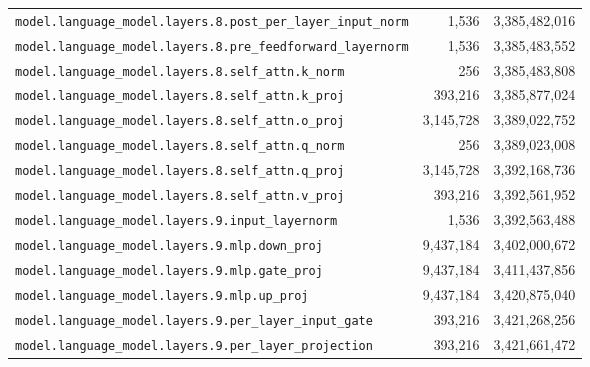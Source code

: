 \documentclass[10pt,a4paper]{article}
\theoremstyle{definition}
\begin{document}
\begin{appendices}
\begin{longtable}{p{9.5cm}rr}
\texttt{model.\allowbreak{}language\_model.\allowbreak{}layers.\allowbreak{}8.\allowbreak{}post\_per\_layer\_input\_norm} & 1,536 & 3,385,482,016 \\
\texttt{model.\allowbreak{}language\_model.\allowbreak{}layers.\allowbreak{}8.\allowbreak{}pre\_feedforward\_layernorm} & 1,536 & 3,385,483,552 \\
\texttt{model.\allowbreak{}language\_model.\allowbreak{}layers.\allowbreak{}8.\allowbreak{}self\_attn.\allowbreak{}k\_norm} & 256 & 3,385,483,808 \\
\texttt{model.\allowbreak{}language\_model.\allowbreak{}layers.\allowbreak{}8.\allowbreak{}self\_attn.\allowbreak{}k\_proj} & 393,216 & 3,385,877,024 \\
\texttt{model.\allowbreak{}language\_model.\allowbreak{}layers.\allowbreak{}8.\allowbreak{}self\_attn.\allowbreak{}o\_proj} & 3,145,728 & 3,389,022,752 \\
\texttt{model.\allowbreak{}language\_model.\allowbreak{}layers.\allowbreak{}8.\allowbreak{}self\_attn.\allowbreak{}q\_norm} & 256 & 3,389,023,008 \\
\texttt{model.\allowbreak{}language\_model.\allowbreak{}layers.\allowbreak{}8.\allowbreak{}self\_attn.\allowbreak{}q\_proj} & 3,145,728 & 3,392,168,736 \\
\texttt{model.\allowbreak{}language\_model.\allowbreak{}layers.\allowbreak{}8.\allowbreak{}self\_attn.\allowbreak{}v\_proj} & 393,216 & 3,392,561,952 \\
\texttt{model.\allowbreak{}language\_model.\allowbreak{}layers.\allowbreak{}9.\allowbreak{}input\_layernorm} & 1,536 & 3,392,563,488 \\
\texttt{model.\allowbreak{}language\_model.\allowbreak{}layers.\allowbreak{}9.\allowbreak{}mlp.\allowbreak{}down\_proj} & 9,437,184 & 3,402,000,672 \\
\texttt{model.\allowbreak{}language\_model.\allowbreak{}layers.\allowbreak{}9.\allowbreak{}mlp.\allowbreak{}gate\_proj} & 9,437,184 & 3,411,437,856 \\
\texttt{model.\allowbreak{}language\_model.\allowbreak{}layers.\allowbreak{}9.\allowbreak{}mlp.\allowbreak{}up\_proj} & 9,437,184 & 3,420,875,040 \\
\texttt{model.\allowbreak{}language\_model.\allowbreak{}layers.\allowbreak{}9.\allowbreak{}per\_layer\_input\_gate} & 393,216 & 3,421,268,256 \\
\texttt{model.\allowbreak{}language\_model.\allowbreak{}layers.\allowbreak{}9.\allowbreak{}per\_layer\_projection} & 393,216 & 3,421,661,472 \\

\end{longtable}
\end{appendices}
\end{document}
